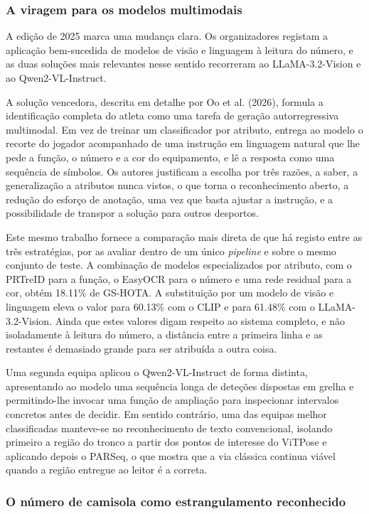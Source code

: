 \subsubsection*{A viragem para os modelos multimodais}

A edição de 2025 marca uma mudança clara. Os organizadores registam a aplicação bem-sucedida de
modelos de visão e linguagem à leitura do número, e as duas soluções mais relevantes nesse
sentido recorreram ao LLaMA-3.2-Vision e ao Qwen2-VL-Instruct.

A solução vencedora, descrita em detalhe por Oo et al. (2026), formula a identificação completa
do atleta como uma tarefa de geração autorregressiva multimodal. Em vez de treinar um
classificador por atributo, entrega ao modelo o recorte do jogador acompanhado de uma instrução
em linguagem natural que lhe pede a função, o número e a cor do equipamento, e lê a resposta
como uma sequência de símbolos. Os autores justificam a escolha por três razões, a saber, a
generalização a atributos nunca vistos, o que torna o reconhecimento aberto, a redução do
esforço de anotação, uma vez que basta ajustar a instrução, e a possibilidade de transpor a
solução para outros desportos.

Este mesmo trabalho fornece a comparação mais direta de que há registo entre as três estratégias,
por as avaliar dentro de um único \emph{pipeline} e sobre o mesmo conjunto de teste. A
combinação de modelos especializados por atributo, com o PRTreID para a função, o EasyOCR para o
número e uma rede residual para a cor, obtém 18.11\% de GS-HOTA. A substituição por um modelo de
visão e linguagem eleva o valor para 60.13\% com o CLIP e para 61.48\% com o LLaMA-3.2-Vision.
Ainda que estes valores digam respeito ao sistema completo, e não isoladamente à leitura do
número, a distância entre a primeira linha e as restantes é demasiado grande para ser atribuída
a outra coisa.

Uma segunda equipa aplicou o Qwen2-VL-Instruct de forma distinta, apresentando ao modelo uma
sequência longa de deteções dispostas em grelha e permitindo-lhe invocar uma função de ampliação
para inspecionar intervalos concretos antes de decidir. Em sentido contrário, uma das equipas
melhor classificadas manteve-se no reconhecimento de texto convencional, isolando primeiro a
região do tronco a partir dos pontos de interesse do ViTPose e aplicando depois o PARSeq, o que
mostra que a via clássica continua viável quando a região entregue ao leitor é a correta.

\subsubsection*{O número de camisola como estrangulamento reconhecido}


